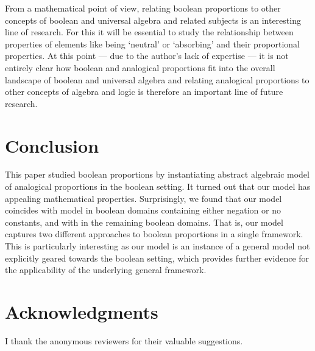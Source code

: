 \documentclass[11pt]{amsart}
\theoremstyle{definition} %
\begin{document}
From a mathematical point of view, relating boolean proportions to other concepts of boolean and universal algebra and related subjects is an interesting line of research. For this it will be essential to study the relationship between properties of elements like being `neutral' or `absorbing' and their proportional properties. At this point --- due to the author's lack of expertise --- it is not entirely clear how boolean and analogical proportions fit into the overall landscape of boolean and universal algebra and relating analogical proportions to other concepts of algebra and logic is therefore an important line of future research.

\section{Conclusion}

This paper studied boolean proportions by instantiating  abstract algebraic model of analogical proportions in the boolean setting. It turned out that our model has appealing mathematical properties. Surprisingly, we found that our model coincides with  model in boolean domains containing either negation or no constants, and with  in the remaining boolean domains. That is, our model captures two different approaches to boolean proportions in a single framework. This is particularly interesting as our model is an instance of a general model not explicitly geared towards the boolean setting, which provides further evidence for the applicability of the underlying general framework.

\section*{Acknowledgments}

I thank the anonymous reviewers for their valuable suggestions.



\end{document}
